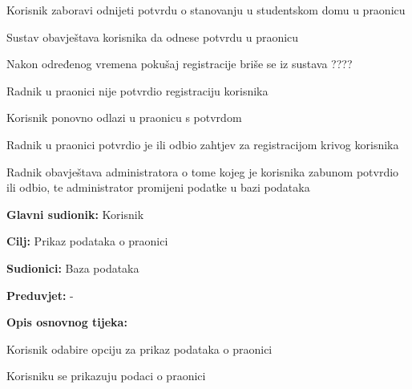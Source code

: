 \begin{packed_item}
\begin{packed_item}
						\item[4.a] Korisnik zaboravi odnijeti potvrdu o stanovanju u studentskom domu u praonicu
						\item[] \begin{packed_enum}
							
							\item Sustav obavještava korisnika da odnese potvrdu u praonicu
							\item Nakon određenog vremena pokušaj registracije briše se iz sustava ????
							
						\end{packed_enum}
					
						\item[5.a] Radnik u praonici nije potvrdio registraciju korisnika
						\item[] \begin{packed_enum}
							
							\item Korisnik ponovno odlazi u praonicu s potvrdom
							
						\end{packed_enum}
					
						\item[5.a] Radnik u praonici potvrdio je ili odbio zahtjev za registracijom krivog korisnika
						\item[] \begin{packed_enum}
							
							\item Radnik obavještava administratora o tome kojeg je korisnika zabunom potvrdio ili odbio, te administrator promijeni podatke u bazi podataka
							
						\end{packed_enum}
						
						
					\end{packed_item}	
				\end{packed_item}
				
				\noindent {}
				\begin{packed_item}
					
					\item \textbf{Glavni sudionik: } Korisnik
					\item  \textbf{Cilj:} Prikaz podataka o praonici
					\item  \textbf{Sudionici:} Baza podataka
					\item  \textbf{Preduvjet:} -
					\item  \textbf{Opis osnovnog tijeka:}
					
					\item[] \begin{packed_enum}
						
						\item Korisnik odabire opciju za prikaz podataka o praonici
						\item Korisniku se prikazuju podaci o praonici
						
					\end{packed_enum}
					
				\end{packed_item}
				
